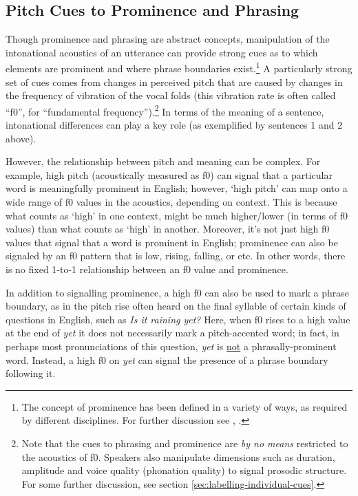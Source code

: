 \documentclass[11pt, twoside]{memoir}
\def\langtext#1{\textit{#1}}
\def\langtextquot#1{\langtext{#1}}
\begin{document}
\subsection{Pitch Cues to Prominence and Phrasing}\label{sec:pitch-cues-to-prominence-and-phrasing}

Though prominence and phrasing are abstract concepts, manipulation of the intonational acoustics of an utterance can provide strong cues as to which elements are prominent and where phrase boundaries exist.\footnote{The concept of prominence has been defined in a variety of ways, as required by different disciplines. For further discussion see \citealt{gussenhoven15}, \citealt{wagner-15}.} A particularly strong set of cues comes from changes in perceived pitch that are caused by changes in the frequency of vibration of the vocal folds (this vibration rate is often called “f0”, for “fundamental frequency”).\footnote{Note that the cues to phrasing and prominence are \textit{by no means} restricted to the acoustics of f0.  Speakers also manipulate dimensions such as duration, amplitude and voice quality (phonation quality) to signal prosodic structure. For some further discussion, see section \ref{sec:labelling-individual-cues}.} In terms of the meaning of a sentence, intonational differences can play a key role (as exemplified by sentences 1 and 2 above).

However, the relationship between pitch and meaning can be complex. For example, high pitch (acoustically measured as f0) can signal that a particular word is meaningfully prominent in English; however, ‘high pitch’ can map onto a wide range of f0 values in the acoustics, depending on context. This is because what counts as ‘high’ in one context, might be much higher\slash lower (in terms of f0 values) than what counts as ‘high’ in another. Moreover, it’s not just high f0 values that signal that a word is prominent in English; prominence can also be signaled by an f0 pattern that is low, rising, falling, or etc. In other words, there is no fixed 1-to-1 relationship between an f0 value and prominence.

In addition to signalling prominence, a high f0 can also be used to mark a phrase boundary, as in the pitch rise often heard on the final syllable of certain kinds of questions in English, such as \langtextquot{Is it raining yet?} Here, when f0 rises to a high value at the end of \langtext{yet} it does not necessarily mark a pitch-accented word; in fact, in perhaps most pronunciations of this question, \langtext{yet} is \uline{not} a phrasally-prominent word. Instead, a high f0 on \langtext{yet} can signal the presence of a phrase boundary following it.
\end{document}
